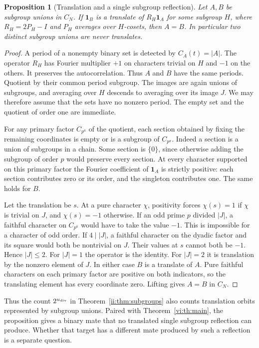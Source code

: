 \documentclass[11pt]{article}
\numberwithin{equation}{section}
\newtheorem{proposition}[theorem]{Proposition}
\theoremstyle{definition}
\theoremstyle{remark}
\newcommand{\ind}{\mathbf1}
\begin{document}
\begin{proposition}[Translation and a single subgroup reflection]\label{bridge:separation}
Let $A,B$ be subgroup unions in $C_N$. If $\ind_B$ is a translate of $R_H\ind_A$ for some subgroup $H$, where $R_H=2P_H-I$ and $P_H$ averages over $H$-cosets, then $A=B$. In particular two distinct subgroup unions are never translates.
\end{proposition}
\begin{proof}
A period of a nonempty binary set is detected by $C_A(t)=|A|$. The operator $R_H$ has Fourier multiplier $+1$ on characters trivial on $H$ and $-1$ on the others. It preserves the autocorrelation. Thus $A$ and $B$ have the same periods. Quotient by their common period subgroup. The images are again unions of subgroups, and averaging over $H$ descends to averaging over its image $J$. We may therefore assume that the sets have no nonzero period. The empty set and the quotient of order one are immediate.

For any primary factor $C_{p^a}$ of the quotient, each section obtained by fixing the remaining coordinates is empty or is a subgroup of $C_{p^a}$. Indeed a section is a union of subgroups in a chain. Some section is $\{0\}$, since otherwise adding the subgroup of order $p$ would preserve every section. At every character supported on this primary factor the Fourier coefficient of $\ind_A$ is strictly positive: each section contributes zero or its order, and the singleton contributes one. The same holds for $B$.

Let the translation be $s$. At a pure character $\chi$, positivity forces $\chi(s)=1$ if $\chi$ is trivial on $J$, and $\chi(s)=-1$ otherwise. If an odd prime $p$ divided $|J|$, a faithful character on $C_{p^a}$ would have to take the value $-1$. This is impossible for a character of odd order. If $4\mid |J|$, a faithful character on the dyadic factor and its square would both be nontrivial on $J$. Their values at $s$ cannot both be $-1$. Hence $|J|\le2$. For $|J|=1$ the operator is the identity. For $|J|=2$ it is translation by the nonzero element of $J$. In either case $B$ is a translate of $A$. Pure faithful characters on each primary factor are positive on both indicators, so the translating element has every coordinate zero. Lifting gives $A=B$ in $C_N$.
\end{proof}
Thus the count $2^{u_{\rm div}}$ in Theorem~\ref{ii:thm:subgroups} also counts translation orbits represented by subgroup unions. Paired with Theorem~\ref{vi:th:main}, the proposition gives a binary mate that no translated single subgroup reflection can produce. Whether that target has a different mate produced by such a reflection is a separate question.
\end{document}

